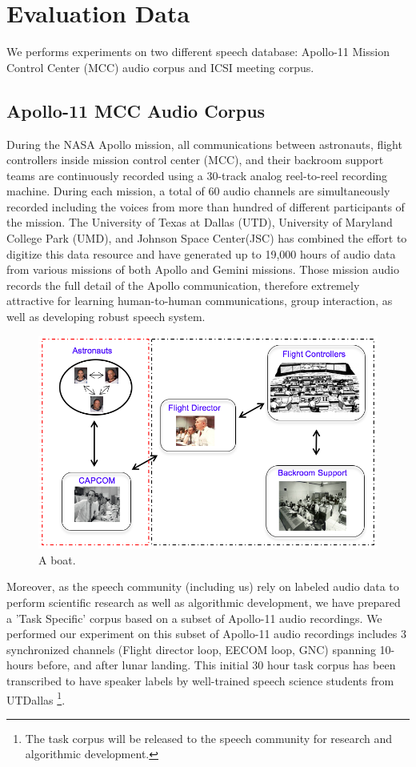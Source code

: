 \documentclass[final,authoryear,5p,times,twocolumn]{elsarticle}
\begin{document}
\section{Evaluation Data}
We performs experiments on two different speech database: Apollo-11 Mission Control Center (MCC) audio  corpus and ICSI meeting corpus. 

\subsection{Apollo-11 MCC Audio Corpus}
During the NASA Apollo mission, all communications between astronauts, flight controllers inside mission control center (MCC), and their backroom support teams are continuously recorded using a 30-track analog reel-to-reel recording machine. During each mission, a total of 60 audio channels are simultaneously recorded including the voices from more than hundred of different participants of the mission. The University of Texas at Dallas (UTD), University of Maryland College Park (UMD), and Johnson Space Center(JSC) has combined the effort to digitize this data resource and have generated up to 19,000 hours of audio data from various missions of both Apollo and Gemini missions. Those mission audio records the full detail of the Apollo communication, therefore extremely attractive for learning human-to-human communications, group interaction, as well as developing robust speech system. 
\begin{figure}[t]
	\includegraphics[width=\linewidth]{figs/comm5}
	\caption{A boat.}
	\label{fig:boat1}
\end{figure}
Moreover, as the speech community (including us) rely on labeled audio data to perform scientific research as well as algorithmic development, we have prepared a 'Task Specific' corpus based on a subset of Apollo-11 audio recordings. We performed our experiment on this subset of Apollo-11 audio recordings includes 3 synchronized channels
(Flight director loop, EECOM loop, GNC) spanning 10-hours before, and after lunar landing. This initial 30 hour task corpus has been transcribed to have speaker labels by well-trained speech science students from UTDallas \footnote{The task corpus will be released to the speech community for research and algorithmic development.}.
\end{document}
